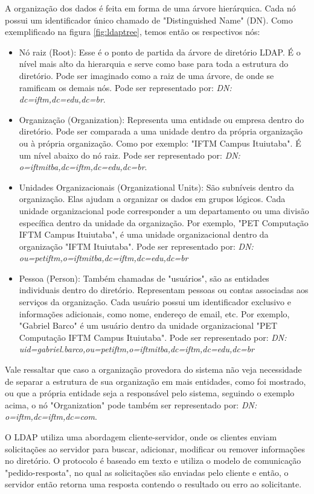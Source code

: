A organização dos dados é feita em forma de uma árvore hierárquica. Cada nó possui um identificador único chamado de "Distinguished Name" (DN). Como exemplificado na figura \ref{fig:ldaptree}, temos então os respectivos nós:
\begin{itemize}
	\item Nó raiz (Root): Esse é o ponto de partida da árvore de diretório LDAP. É o nível mais alto da hierarquia e serve como base para toda a estrutura do diretório. Pode ser imaginado como a raiz de uma árvore, de onde se ramificam os demais nós. Pode ser representado por: \textit{DN: dc=iftm,dc=edu,dc=br}.
    \item Organização (Organization): Representa uma entidade ou empresa dentro do diretório. Pode ser comparada a uma unidade dentro da própria organização ou à própria organização. Como por exemplo: "IFTM Campus Ituiutaba". É um nível abaixo do nó raiz. Pode ser representado por: \textit{DN: o=iftmitba,dc=iftm,dc=edu,dc=br}.
    \item Unidades Organizacionais (Organizational Units): São subníveis dentro da organização. Elas ajudam a organizar os dados em grupos lógicos. Cada unidade organizacional pode corresponder a um departamento ou uma divisão específica dentro da unidade da organização. Por exemplo, "PET Computação IFTM Campus Ituiutaba", é uma unidade organizacional dentro da organização "IFTM Ituiutaba". Pode ser representado por: \textit{DN: ou=petiftm,o=iftmitba,dc=iftm,dc=edu,dc=br}
    \item Pessoa (Person): Também chamadas de "usuários", são as entidades individuais dentro do diretório. Representam pessoas ou contas associadas aos serviços da organização. Cada usuário possui um identificador exclusivo e informações adicionais, como nome, endereço de email, etc. Por exemplo, "Gabriel Barco" é um usuário dentro da unidade organizacional "PET Computação IFTM Campus Ituiutaba". Pode ser representado por: \textit{DN: uid=gabriel.barco,ou=petiftm,o=iftmitba,dc=iftm,dc=edu,dc=br}
\end{itemize}

Vale ressaltar que caso a organização provedora do sistema não veja necessidade de separar a estrutura de sua organização em mais entidades, como foi mostrado, ou que a própria entidade seja a responsável pelo sistema, seguindo o exemplo acima, o nó "Organization" pode também ser representado por: \textit{DN: o=iftm,dc=iftm,dc=com}.

O LDAP utiliza uma abordagem cliente-servidor, onde os clientes enviam solicitações ao servidor para buscar, adicionar, modificar ou remover informações no diretório. O protocolo é baseado em texto e utiliza o modelo de comunicação "pedido-resposta", no qual as solicitações são enviadas pelo cliente e então, o servidor então retorna uma resposta contendo o resultado ou erro ao solicitante. 

